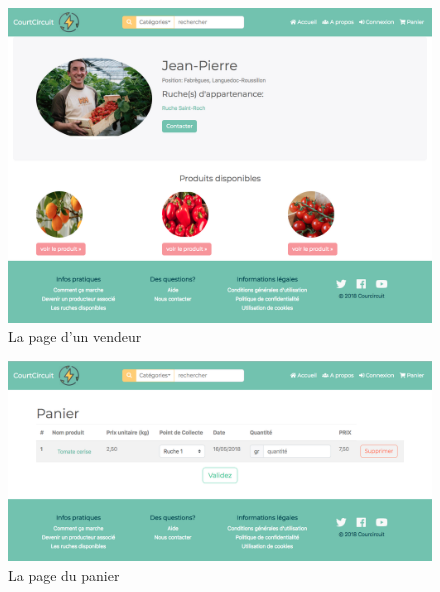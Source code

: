 \documentclass[a4paper,12pt]{report}
\theoremstyle{break}
\theoremstyle{break}
\theoremstyle{break}
\theoremstyle{break}
\theoremstyle{definition}
\theoremstyle{remark}
\begin{document}
\begin{appendices}
\begin{figure}[!ht]
  \centering
  \includegraphics[scale=0.35]{images/vendeur.png}
  \caption{La page d'un vendeur}
\end{figure}

\begin{figure}[!ht]
  \centering
  \includegraphics[scale=0.35]{images/panier.png}
  \caption{La page du panier}
\end{figure}


\end{appendices}
\end{document}
